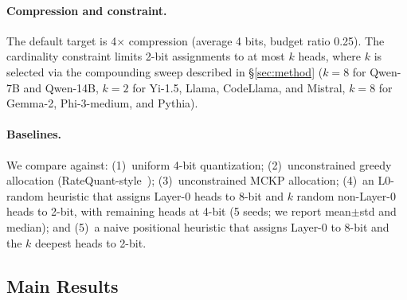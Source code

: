 \paragraph{Compression and constraint.}
The default target is 4$\times$ compression (average 4 bits, budget ratio 0.25).
The cardinality constraint limits 2-bit assignments to at most $k$ heads, where $k$ is selected via the compounding sweep described in \S\ref{sec:method} ($k{=}8$ for Qwen-7B and Qwen-14B, $k{=}2$ for Yi-1.5, Llama, CodeLlama, and Mistral, $k{=}8$ for Gemma-2, Phi-3-medium, and Pythia).

\paragraph{Baselines.}
We compare against:
(1)~uniform 4-bit quantization;
(2)~unconstrained greedy allocation (RateQuant-style~\cite{zuo2026ratequant});
(3)~unconstrained MCKP allocation;
(4)~an L0-random heuristic that assigns Layer-0 heads to 8-bit and $k$ random non-Layer-0 heads to 2-bit, with remaining heads at 4-bit (5 seeds; we report mean$\pm$std and median);
and (5)~a naive positional heuristic that assigns Layer-0 to 8-bit and the $k$ deepest heads to 2-bit.

\subsection{Main Results}
\label{sec:main_results}

